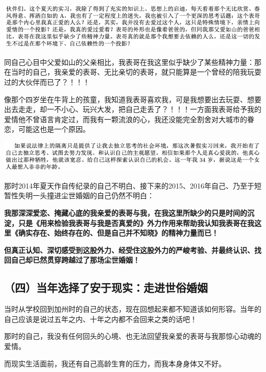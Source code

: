 \documentclass[9pt, b5paper]{article}
\begin{document}
\begin{center}
\includegraphics[width=.9\linewidth]{./pic/backups_plans_20210422_075555.png}
\end{center}

同自己心目中父爱如山的父亲相比，我表哥在我这里似乎缺少了某些精神力量：那在当时的自己，我亲爱的表哥、无比亲切的表哥，就只能算是一个曾经的陪我玩耍过的大伙伴而已了？！！！

像那个四岁坐在牛背上的孩童，我知道我表哥喜欢我，可是我想要出去玩耍、想要出去走走，却一不小心、玩兴大发，把自己走丢了？！！！一方面我表哥给予我的爱情他不曾语言肯定过，而我有一颗流浪的心，我还没能完全割舍对大城市的眷恋，可能这也是一个原因。

\begin{center}
\includegraphics[width=.9\linewidth]{./pic/backups_plans_20210422_075830.png}
\end{center}

那时2014年夏天作自传纪录的自己不明白、接下来的2015、2016年自己、乃至于短暂性失明一头撞进尘世婚姻的自己仍然不明白：

\textbf{我那深深爱恋、掩藏心底的我亲爱的表哥与我，在我这里所缺少的只是时间的沉淀，只是《用来检验我表哥与我是否真爱的》外力作用来帮助我认知我表哥在我这里《确实存在、始终存在的、但是自己并不知晓》的精神力量而已！}

\textbf{但真正认知、深切感受到这股外力、经受住这股外力的严峻考验、并最终认识、找回自己却已然贯穿跨越过了那场尘世婚姻！}

\subsection{（四）当年选择了安于现实：走进世俗婚姻}
\label{sec:orgb37caa7}

当时从学校回到加州时的自己的状态，现在回想起来都不知道该如何形容。当年的自己应该是说过五年之内、十年之内都不会回来之类的话吧！

那时的自己，我没有任何回头的心境、也无法回望我亲爱的表哥与我那惊心动魂的爱情。 

而现实生活面前，我还有自己高龄生育的压力，而我本身身体又不好。
\end{document}
